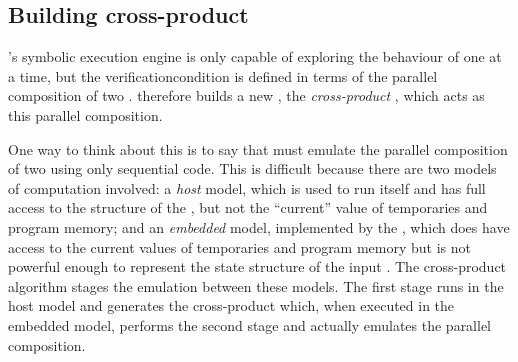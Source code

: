 \subsection{Building cross-product {\StateMachines}}
\label{sect:using:build_cross_product}


{\Technique}'s symbolic execution engine is only capable of exploring
the behaviour of one {\StateMachine} at a time, but the
\gls{verificationcondition} is defined in terms of the parallel
composition of two {\StateMachines}.  {\Technique} therefore builds a
new {\StateMachine}, the \emph{cross-product {\StateMachine}}, which
acts as this parallel composition.

One way to think about this is to say that {\technique} must emulate
the parallel composition of two {\StateMachines} using only sequential
code.  This is difficult because there are two models of computation
involved: a \emph{host} model, which is used to run {\technique}
itself and has full access to the structure of the {\StateMachines},
but not the ``current'' value of {\StateMachine} temporaries and
program memory; and an \emph{embedded} model, implemented by the
{\StateMachines}, which does have access to the current values of
temporaries and program memory but is not powerful enough to represent
the state structure of the input {\StateMachines}.  The cross-product
algorithm stages the emulation between these models.  The first stage
runs in the host model and generates the cross-product {\StateMachine}
which, when executed in the embedded model, performs the second stage
and actually emulates the parallel composition.

